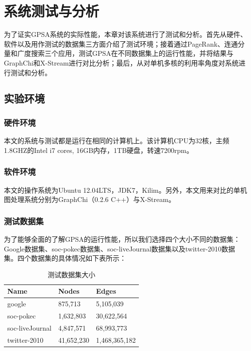 
\chapter{系统测试与分析}

为了证实GPSA系统的实际性能，本章对该系统进行了测试和分析。首先从硬件、软件以及用作测试的数据集三方面介绍了测试环境；接着通过PageRank、连通分量和广度搜索三个应用，测试GPSA在不同数据集上的运行性能，并将结果与GraphChi和X-Stream进行对比分析；最后，从对单机多核的利用率角度对系统进行测试和分析。


\section{实验环境}

\subsection{硬件环境}
本文的系统与测试都是运行在相同的计算机上。该计算机CPU为32核，主频1.8GHZ的Intel i7 cores, 16GB内存，1TB硬盘，转速7200rpm。
\subsection{软件环境}
本文的操作系统为Ubuntu 12.04LTS，JDK7，Kilim。另外，本文用来对比的单机图处理系统分别为GraphChi（0.2.6 C++）与X-Stream。

\subsection{测试数据集}
为了能够全面的了解GPSA的运行性能，所以我们选择四个大小不同的数据集：Google数据集、soc-pokec数据集、soc-liveJournal数据集以及twitter-2010数据集。四个数据集的具体情况如下表所示：
\renewcommand\arraystretch{1.5}%
\begin{table}[!h]
\caption{测试数据集大小}\label{tab:bench}
\vspace{0.5em}
\centering
\begin{tabular}{l*{1}{C{2cm}}*{1}{L{6.2cm}}}
\toprule
Name         & Nodes & Edges\\
\midrule
google      & 875,713  & 5,105,039\\
soc-pokec      & 1,632,803 & 30,622,564\\
soc-liveJournal      & 4,847,571 & 68,993,773\\
twitter-2010      & 41,652,230 & 1,468,365,182\\

\bottomrule
\end{tabular}
\vspace{\baselineskip}
\end{table}
\renewcommand\arraystretch{1}


